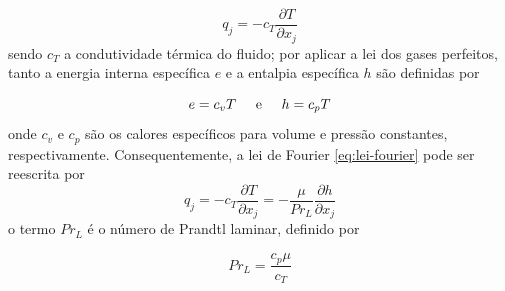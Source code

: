 \begin{equation}
	\label{eq:lei-fourier}
	q_j = -c_{T}\frac{\partial T}{\partial x_j}
\end{equation}
%
sendo $c_{T}$ a condutividade térmica do fluido; por aplicar a lei dos gases perfeitos, tanto a energia interna específica $e$ e a entalpia específica $h$ são definidas por

\begin{equation}
	\label{eq:equacoes-entalpia-energiainterna-calores-especificos}
	e = c_{v}T \hspace{0.5cm} \text{e} \hspace{0.5cm} h = c_{p}T
\end{equation}
%
onde $c_v$ e $c_p$ são os calores específicos para volume e pressão constantes, respectivamente. Consequentemente, a lei de Fourier \ref{eq:lei-fourier} pode ser reescrita por
%
\begin{equation}
	\label{eq:lei-fourier-NOVA}
	q_j = -c_T\frac{\partial T}{\partial x_j} = -\frac{\mu}{Pr_L}\frac{\partial h}{\partial x_j}
\end{equation}
%
o termo $Pr_L$ é o número de Prandtl laminar, definido por

\begin{equation}
	Pr_L = \frac{c_{p}\mu}{c_T}
\end{equation}